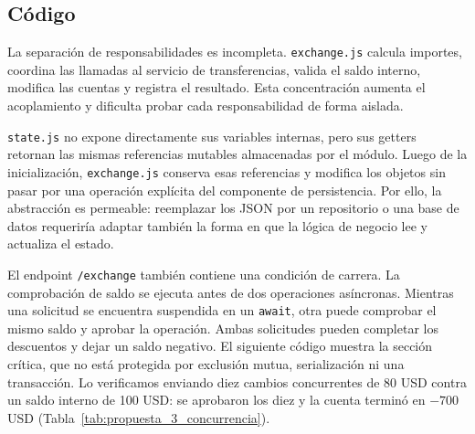     \subsection{Código}
    \label{sec:codigo}

    La separación de responsabilidades es incompleta. \texttt{exchange.js} calcula
    importes, coordina las llamadas al servicio de transferencias, valida el saldo
    interno, modifica las cuentas y registra el resultado. Esta concentración aumenta
    el acoplamiento y dificulta probar cada responsabilidad de forma aislada.

    \begin{code}
        
        \caption{Responsabilidades concentradas en la función \texttt{exchange} de \texttt{app/exchange.js}.}
        \label{lst:separacion_de_responsabilidades}
    \end{code}

    \texttt{state.js} no expone directamente sus variables internas, pero sus getters
    retornan las mismas referencias mutables almacenadas por el módulo. Luego de la
    inicialización, \texttt{exchange.js} conserva esas referencias y modifica los
    objetos sin pasar por una operación explícita del componente de persistencia.
    Por ello, la abstracción es permeable: reemplazar los JSON por un repositorio o
    una base de datos requeriría adaptar también la forma en que la lógica de negocio
    lee y actualiza el estado.

    \begin{code}
        
        \caption{Referencias mutables al estado obtenidas en \texttt{init} de \texttt{app/exchange.js}.}
        \label{lst:acoplamiento}
    \end{code}

    El endpoint \texttt{/exchange} también contiene una condición de carrera. La comprobación
    de saldo se ejecuta antes de dos operaciones asíncronas. Mientras una solicitud se
    encuentra suspendida en un \texttt{await}, otra puede comprobar el mismo saldo y
    aprobar la operación. Ambas solicitudes pueden completar los descuentos y dejar
    un saldo negativo. El siguiente código muestra la sección crítica,
    que no está protegida por exclusión mutua, serialización ni una transacción.
    Lo verificamos enviando diez cambios concurrentes de 80 USD contra un saldo interno de
    100 USD: se aprobaron los diez y la cuenta terminó en $-700$ USD
    (Tabla~\ref{tab:propuesta_3_concurrencia}).

